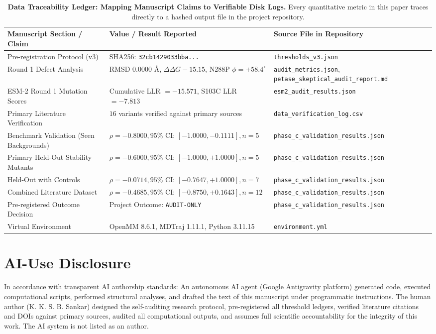 \documentclass[11pt,a4paper]{article}
\begin{document}
\begin{table}[H]
\centering
\small
\caption{\textbf{Data Traceability Ledger: Mapping Manuscript Claims to Verifiable Disk Logs.} Every quantitative metric in this paper traces directly to a hashed output file in the project repository.}
\label{tab:traceability}
\begin{tabularx}{\textwidth}{p{4.2cm}p{5.5cm}X}
\toprule
\textbf{Manuscript Section / Claim} & \textbf{Value / Result Reported} & \textbf{Source File in Repository} \\
\midrule
Pre-registration Protocol (v3) & SHA256: \texttt{32cb1429033bba...} & \texttt{thresholds\_v3.json} \\
Round 1 Defect Analysis & RMSD $0.0000\text{ \AA}$, $\Delta\Delta G -15.15$, N288P $\phi = +58.4^\circ$ & \texttt{audit\_metrics.json}, \texttt{petase\_skeptical\_audit\_report.md} \\
ESM-2 Round 1 Mutation Scores & Cumulative LLR $= -15.571$, S103C LLR $= -7.813$ & \texttt{esm2\_audit\_results.json} \\
Primary Literature Verification & $16$ variants verified against primary sources & \texttt{data\_verification\_log.csv} \\
Benchmark Validation (Seen Backgrounds) & $\rho = -0.8000, 95\%\text{ CI: } [-1.0000, -0.1111], n = 5$ & \texttt{phase\_c\_validation\_results.json} \\
Primary Held-Out Stability Mutants & $\rho = -0.6000, 95\%\text{ CI: } [-1.0000, +1.0000], n = 5$ & \texttt{phase\_c\_validation\_results.json} \\
Held-Out with Controls & $\rho = -0.0714, 95\%\text{ CI: } [-0.7647, +1.0000], n = 7$ & \texttt{phase\_c\_validation\_results.json} \\
Combined Literature Dataset & $\rho = -0.4685, 95\%\text{ CI: } [-0.8750, +0.1643], n = 12$ & \texttt{phase\_c\_validation\_results.json} \\
Pre-registered Outcome Decision & Project Outcome: \texttt{AUDIT-ONLY} & \texttt{phase\_c\_validation\_results.json} \\
Virtual Environment & OpenMM 8.6.1, MDTraj 1.11.1, Python 3.11.15 & \texttt{environment.yml} \\
\bottomrule
\end{tabularx}
\end{table}

\section{AI-Use Disclosure}
In accordance with transparent AI authorship standards:
An autonomous AI agent (Google Antigravity platform) generated code, executed computational scripts, performed structural analyses, and drafted the text of this manuscript under programmatic instructions. The human author (K. K. S. B. Sankar) designed the self-auditing research protocol, pre-registered all threshold ledgers, verified literature citations and DOIs against primary sources, audited all computational outputs, and assumes full scientific accountability for the integrity of this work. The AI system is not listed as an author.
\end{document}

